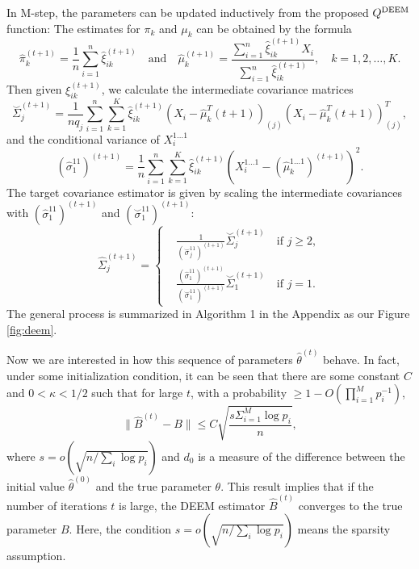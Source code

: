 \documentclass[11pt]{article}
\newcommand{\wh}{\widehat}
\begin{document}
In M-step, the parameters can be updated inductively from the proposed $Q^{\textup{DEEM}}$ function:
The estimates for $\pi_k$ and $\mu_k$ can be obtained by the formula
\begin{equation*}
  \wh\pi_k^{(t+1)} = \frac{1}{n}\sum_{i=1}^n \wh\xi_{ik}^{(t+1)} \quad\text{and}\quad \wh\mu_k^{(t+1)} = \frac{\sum_{i=1}^n \wh\xi_{ik}^{(t+1)}X_i}{\sum_{i=1}^n \wh\xi_{ik}^{(t+1)}} ,\quad k=1,2,\dots, K.
\end{equation*}
Then given $\xi_{ik}^{(t+1)}$, we calculate the intermediate covariance matrices
\begin{equation*}
  \overset  \smile \Sigma^{(t+1)}_j = \frac{1}{nq_j} \sum_{i=1}^n \sum_{k=1}^K \wh\xi^{(t+1)}_{ik} (X_i - \wh\mu_k^T{(t+1)})_{(j)} (X_i - \wh\mu_k^T{(t+1)})_{(j)} ^T,
\end{equation*}
and the conditional variance of $X_i^{1\dots1}$
\begin{equation*}
  (\wh\sigma_{1}^{11})^{(t+1)} = \frac{1}{n}\sum_{i=1}^n \sum_{k=1}^K \wh\xi_{ik}^{(t+1)} (X_i^{1\dots1}-(\wh \mu_{k}^{1\dots1})^{(t+1)})^2.
\end{equation*}
The target covariance estimator is given by scaling the intermediate covariances with $(\wh\sigma_{1}^{11})^{(t+1)}$ and $(\overset \smile \sigma_1^{11})^{(t+1)}$:
\begin{equation*}
  \wh \Sigma_j^{(t+1)} =
  \left\{
  \begin{aligned}
  	&\frac{1}{(\overset \smile \sigma_j^{11})^{(t+1)}}\overset \smile \Sigma_j^{(t+1)} \quad \text{if $j\ge 2$}, \\
  	&\frac{(\wh \sigma_1^{11})^{(t+1)}}{(\overset \smile \sigma_1^{11})^{(t+1)}}\overset \smile \Sigma_1^{(t+1)} \quad \text{if $j= 1$}.
  \end{aligned}
  \right.
\end{equation*}
The general process is summarized in Algorithm 1 in the Appendix as our Figure \ref{fig:deem}.

Now we are interested in how this sequence of parameters $\wh\theta^{(t)}$ behave.
In fact, under some initialization condition, it can be seen that there are some constant $C$ and $0<\kappa<1/2$ such that for large $t$, with a probability $\ge 1- O(\prod_{i=1}^M p_i^{-1})$,
$$
\|\wh B^{(t)} - B\| \le C\sqrt{\frac{s \Sigma_{i=1}^M \log p_i}{n}},
$$
where $s=o(\sqrt{n/\sum_i \log p_i})$ and $d_0$ is a measure of the difference between the initial value $\wh \theta^{(0)}$ and the true parameter $\theta$.
This result implies that if the number of iterations $t$ is large, the DEEM estimator $\wh B^{(t)}$ converges to the true parameter $B$.
Here, the condition $s=o(\sqrt{n/\sum_i \log p_i})$ means the sparsity assumption.
\end{document}
